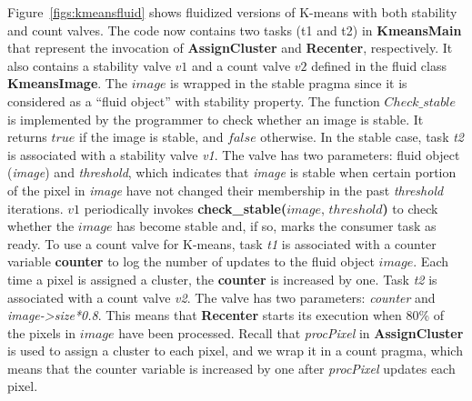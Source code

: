  
Figure~\ref{figs:kmeansfluid} shows fluidized versions of K-means with both stability and count valves. The code now contains two tasks (t1 and t2) in \textbf{KmeansMain} that represent the invocation of \textbf{AssignCluster} and \textbf{Recenter}, respectively. It also contains a stability valve $v1$ and a count valve $v2$ defined in the fluid class \textbf{KmeansImage}. The $image$ is wrapped in the stable pragma since it is considered as a ``fluid object'' with stability property. The function $Check\_stable$ is implemented by the programmer to check whether an image is stable. It returns $true$ if the image is stable, and $false$ otherwise. In the stable case, task \textit{t2} is associated with a stability valve \textit{v1}. The valve  has two parameters: fluid object (\textit{image}) and \textit{threshold}, which indicates that \textit{image} is stable when certain portion of the pixel in \textit{image} have not changed their membership in the past \textit{threshold} iterations. $v1$ periodically invokes \textbf{check\_stable(}$image$, $threshold$\textbf{)} to check whether the $image$ has become stable and, if so, marks the consumer task as ready. To use a count valve for K-means, task \textit{t1} is associated with a counter variable \textbf{counter} to log the number of updates to the fluid object $image$. Each time a pixel is assigned a cluster, the \textbf{counter} is increased by one. Task \textit{t2} is associated with a count valve \textit{v2}. The valve  has two parameters: \textit{counter} and \textit{image->size*0.8}. This means that \textbf{Recenter} starts its execution when 80\% of the pixels in $image$ have been processed. Recall that \textit{procPixel} in \textbf{AssignCluster} is used to assign a cluster to each pixel, and we wrap it in a count pragma, which means that the counter variable is increased by one after \textit{procPixel} updates each pixel. 



